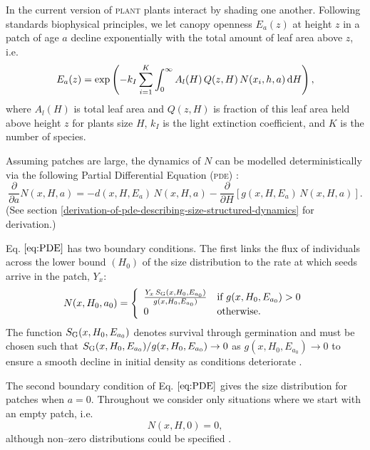 \documentclass[10pt,twoside]{article}
\newcommand{\plant}{\textsc{plant}}
\begin{document}
In the current version of {\plant} plants interact by shading one another.
Following standards biophysical principles, we let canopy openness
\(E_a(z)\) at height \(z\) in a patch of age \(a\) decline exponentially
with the total amount of leaf area above \(z\), i.e.
\begin{equation} \label{eq:light}
  E_a(z) = \exp \left(-k_I  \sum_{i = 1}^{K} \int_{0}^{\infty} A_l(H) \, Q(z, H) \, N(x_i, h, a) \, {\rm d}H \right),
\end{equation}
where \(A_l(H)\) is total leaf area and \(Q(z, H)\) is fraction of
this leaf area held above height \(z\) for plants size \(H\),
\(k_I\) is the light extinction coefficient, and \(K\) is the number
of species.

Assuming patches are large, the dynamics of \(N\) can be modelled
deterministically via the following Partial Differential Equation (\textsc{pde})
\citep{Kohyama-1993, Deroos-1997, Moorcroft-2001}:
\begin{equation} \label{eq:PDE}
  \frac{\partial}{\partial a} N(x, H, a) = - d(x, H, E_a) \, N(x, H, a) - \frac{\partial}{\partial H} \left[g(x, H, E_a) \, N(x, H, a)\right].
\end{equation}
(See section \ref{derivation-of-pde-describing-size-structured-dynamics} for derivation.)

Eq. \(\ref{eq:PDE}\) has two boundary conditions. The first links the
flux of individuals across the lower bound \((H_0)\) of the size
distribution to the rate at which seeds arrive in the patch, \(Y_x\):
\begin{equation} \label{eq:BC1}
  N(x, H_0, a_0) = \left\{
  \begin{array}{ll}   \frac{Y_x \, S_{\rm G} (x, H_0, E_{a_0}) }{ g(x, H_0, E_{a_0}) }  & \textrm{if } g(x, H_0, E_{a_0}) > 0 \\
  0 & \textrm{otherwise.}
  \end{array} \right.
\end{equation}
The function \(S_{\rm G} (x, H_0, E_{a_0})\) denotes survival through
germination and must be chosen such that
\(S_{\rm G} (x, H_0, E_{a_0}) / g(x, H_0, E_{a_0}) \rightarrow 0\) as
\(g(x, H_0, E_{a_0}) \rightarrow 0\) to ensure a smooth decline in
initial density as conditions deteriorate \citep{Falster-2011}.

The second boundary condition of Eq. \(\ref{eq:PDE}\) gives the size
distribution for patches when \(a = 0\). Throughout we consider only
situations where we start with an empty patch, i.e.
\begin{equation} \label{eq:BC2} N\left(x, H,0\right) = 0,
\end{equation}
although non--zero distributions could be specified
\citep[e.g][]{Kohyama-1993, Moorcroft-2001}.
\end{document}
